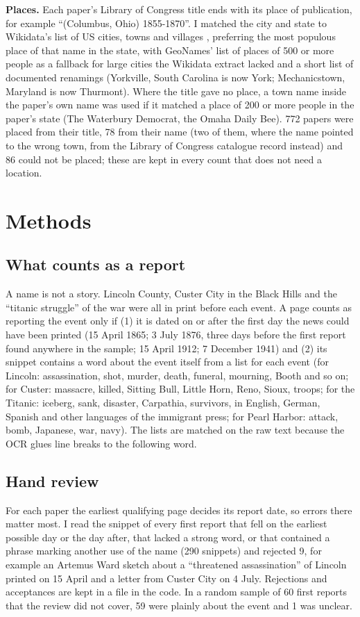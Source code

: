 \documentclass[11pt,a4paper]{article}
\begin{document}
\textbf{Places.} Each paper's Library of Congress title ends with its place of publication, for example ``(Columbus, Ohio) 1855-1870''. I matched the city and state to Wikidata's list of US cities, towns and villages \citep{wikidata}, preferring the most populous place of that name in the state, with GeoNames' list of places of 500 or more people \citep{geonames} as a fallback for large cities the Wikidata extract lacked and a short list of documented renamings (Yorkville, South Carolina is now York; Mechanicstown, Maryland is now Thurmont). Where the title gave no place, a town name inside the paper's own name was used if it matched a place of 200 or more people in the paper's state (The Waterbury Democrat, the Omaha Daily Bee). 772 papers were placed from their title, 78 from their name (two of them, where the name pointed to the wrong town, from the Library of Congress catalogue record instead) and 86 could not be placed; these are kept in every count that does not need a location.

\section{Methods}
\subsection{What counts as a report}
A name is not a story. Lincoln County, Custer City in the Black Hills and the ``titanic struggle'' of the war were all in print before each event. A page counts as reporting the event only if (1) it is dated on or after the first day the news could have been printed (15 April 1865; 3 July 1876, three days before the first report found anywhere in the sample; 15 April 1912; 7 December 1941) and (2) its snippet contains a word about the event itself from a list for each event (for Lincoln: assassination, shot, murder, death, funeral, mourning, Booth and so on; for Custer: massacre, killed, Sitting Bull, Little Horn, Reno, Sioux, troops; for the Titanic: iceberg, sank, disaster, Carpathia, survivors, in English, German, Spanish and other languages of the immigrant press; for Pearl Harbor: attack, bomb, Japanese, war, navy). The lists are matched on the raw text because the OCR glues line breaks to the following word.

\subsection{Hand review}
For each paper the earliest qualifying page decides its report date, so errors there matter most. I read the snippet of every first report that fell on the earliest possible day or the day after, that lacked a strong word, or that contained a phrase marking another use of the name (290 snippets) and rejected 9, for example an Artemus Ward sketch about a ``threatened assassination'' of Lincoln printed on 15 April and a letter from Custer City on 4 July. Rejections and acceptances are kept in a file in the code. In a random sample of 60 first reports that the review did not cover, 59 were plainly about the event and 1 was unclear.
\end{document}
